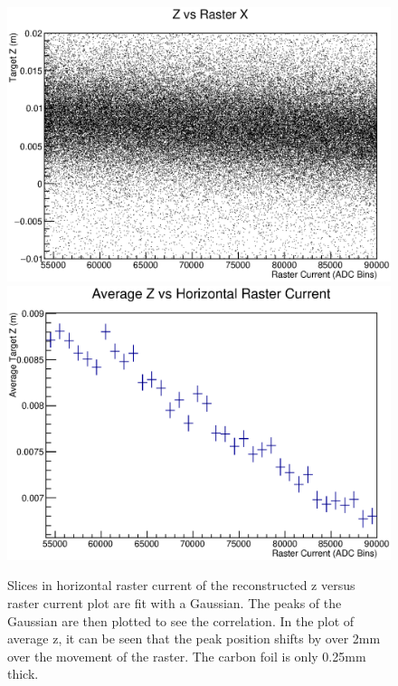 \begin{figure}
	\includegraphics[width=\textwidth]{./app1/figures/old1_zvx.eps}
	\includegraphics[width=\textwidth]{./app1/figures/old1_avgzvx_nofit.eps}
	\caption{Slices in horizontal raster current of the reconstructed z versus raster current plot are fit with a Gaussian. The peaks of the Gaussian are then plotted to see the correlation. In the plot of average z, it can be seen that the peak position shifts by over 2mm over the movement of the raster. The carbon foil is only 0.25mm thick.}
\end{figure}

